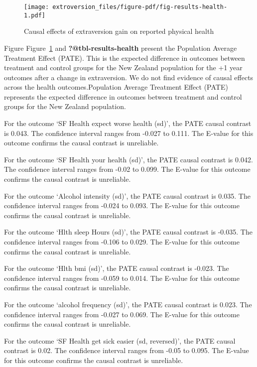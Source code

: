 \documentclass[
  singlecolumn]{report}
\begin{document}
\begin{figure}

{\centering \texttt{[image: extroversion\_files/figure-pdf/fig-results-health-1.pdf]}

}

\caption{\label{fig-results-health}Causal effects of extraversion gain
on reported physical health}

\end{figure}

Figure Figure~\ref{fig-results-health} and \textbf{?@tbl-results-health}
present the Population Average Treatment Effect (PATE). This is the
expected difference in outcomes between treatment and control groups for
the New Zealand population for the +1 year outcomes after a change in
extraversion. We do not find evidence of causal effects across the
health outcomes.Population Average Treatment Effect (PATE) represents
the expected difference in outcomes between treatment and control groups
for the New Zealand population.

For the outcome `SF Health expect worse health (sd)', the PATE causal
contrast is 0.043. The confidence interval ranges from -0.027 to 0.111.
The E-value for this outcome confirms the causal contrast is unreliable.

For the outcome `SF Health your health (sd)', the PATE causal contrast
is 0.042. The confidence interval ranges from -0.02 to 0.099. The
E-value for this outcome confirms the causal contrast is unreliable.

For the outcome `Alcohol intensity (sd)', the PATE causal contrast is
0.035. The confidence interval ranges from -0.024 to 0.093. The E-value
for this outcome confirms the causal contrast is unreliable.

For the outcome `Hlth sleep Hours (sd)', the PATE causal contrast is
-0.035. The confidence interval ranges from -0.106 to 0.029. The E-value
for this outcome confirms the causal contrast is unreliable.

For the outcome `Hlth bmi (sd)', the PATE causal contrast is -0.023. The
confidence interval ranges from -0.059 to 0.014. The E-value for this
outcome confirms the causal contrast is unreliable.

For the outcome `alcohol frequency (sd)', the PATE causal contrast is
0.023. The confidence interval ranges from -0.027 to 0.069. The E-value
for this outcome confirms the causal contrast is unreliable.

For the outcome `SF Health get sick easier (sd, reversed)', the PATE
causal contrast is 0.02. The confidence interval ranges from -0.05 to
0.095. The E-value for this outcome confirms the causal contrast is
unreliable.
\end{document}
